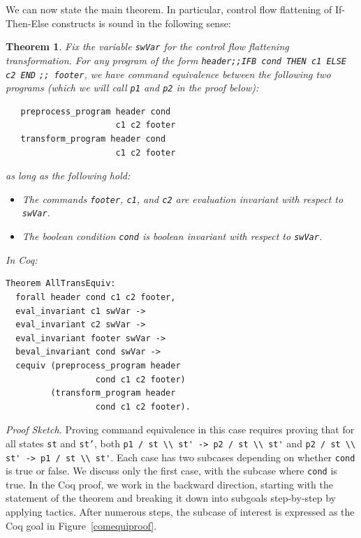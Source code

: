 \documentclass[compsoc,conference,a4paper,10pt,times]{IEEEtran}
\newtheorem{theorem}{Theorem}[section]
\begin{document}
We can now state the main theorem. In particular, control flow flattening of If-Then-Else constructs is sound in the following sense:
\begin{theorem}\label{maintheo}
Fix the variable \texttt{swVar} for the control flow flattening transformation.  
For any program of the form \verb$header;;IFB cond THEN c1 ELSE c2 END$ \verb$;; footer$, we have command equivalence between the following two programs (which we will call \texttt{p1} and \texttt{p2} in the proof below):
\begin{verbatim}
   preprocess_program header cond
                      c1 c2 footer
   transform_program header cond
                      c1 c2 footer
\end{verbatim}

as long as the following hold:
\begin{itemize}
    \item The commands \texttt{footer}, \texttt{c1}, and \texttt{c2} are evaluation invariant with respect to \texttt{swVar}.
    \item The boolean condition \texttt{cond} is boolean invariant with respect to \texttt{swVar}.
\end{itemize}
In Coq:
\begin{verbatim}
Theorem AllTransEquiv:
  forall header cond c1 c2 footer, 
  eval_invariant c1 swVar -> 
  eval_invariant c2 swVar -> 
  eval_invariant footer swVar ->
  beval_invariant cond swVar ->
  cequiv (preprocess_program header
                  cond c1 c2 footer) 
         (transform_program header
                  cond c1 c2 footer).
\end{verbatim}
\end{theorem}
\emph{Proof Sketch.}
Proving command equivalence in this case requires proving that for all states \texttt{st} and \texttt{st'}, both \verb|p1 / st \\ st' -> p2 / st \\ st'| and \verb|p2 / st \\ st' -> p1 / st \\ st'|.  Each case has two subcases depending on whether \texttt{cond} is true or false.  We discuss only the first case, with the subcase where \texttt{cond} is true.  In the Coq proof, we work in the backward direction, starting with the statement of the theorem and breaking it down into subgoals step-by-step by applying tactics.  After numerous steps, the subcase of interest is expressed as the Coq goal in Figure~\ref{comequiproof}.
\end{document}
